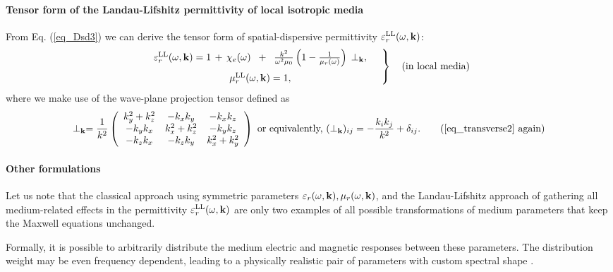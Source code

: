 \paragraph{Tensor form of the Landau-Lifshitz permittivity of local isotropic media}%
From Eq. (\ref{eq_Dsd3}) we can derive the tensor form of spatial-dispersive permittivity $\varepsilon_r^\text{LL}(\omega,{\mathbf{k}})$:
\begin{equation} 
\left.  \begin{array}{c}
\epsLL(\omega,\kk) = 1 \,+\, \chi_e(\omega) \;\;+\;\; \frac{k^2}{\omega^2 \mu_0}\left(1 - \frac{1}{\murl(\omega)}\right) \, \TT, \medskip \\
\muLL(\omega,\kk) = 1, 
\end{array} \quad \right\} \quad \text{(in local media)}
\label{eq_epsmusd3} \end{equation} 
where we make use of the wave-plane projection tensor defined as
\begin{equation} \TT = \frac{1}{k^2} 
\left(\begin{array}{ccc} 
	k_y^2+k_z^2		& -k_x k_y		& -k_x k_z \\ 
	-k_y k_x		& k_x^2+k_z^2	& -k_y k_z \\ 
	-k_z k_x		& -k_z k_y		& k_x^2+k_y^2
	\end{array} \right) 
\text{ or equivalently, }
(\TT)_{ij} = - \frac{k_i k_j}{k^2} + \delta_{ij} . \tag{\ref{eq_transverse2} \again} \end{equation}

\paragraph{Other formulations}%
Let us note that the classical approach using symmetric parameters $\varepsilon_r(\omega,{\mathbf{k}}),\mu_r(\omega,{\mathbf{k}})$, and the Landau-Lifshitz approach of gathering all medium-related effects in the permittivity $\varepsilon_r^\text{LL}(\omega,{\mathbf{k}})$ are only two examples of all possible transformations of medium parameters that keep the Maxwell equations unchanged. 

Formally, it is possible to arbitrarily distribute the medium electric and magnetic responses between these parameters. The distribution weight may be even frequency dependent, leading to a physically realistic pair of parameters with custom spectral shape \cite{skaar2014diamagnetism}.

